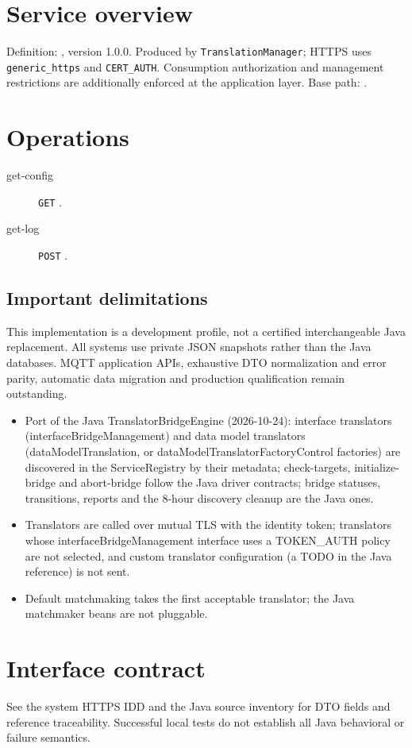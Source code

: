 \documentclass[a4paper]{arrowhead}
\begin{document}
\ArrowheadSetup
\section{Service overview}
Definition: , version 1.0.0. Produced by \texttt{TranslationManager}; HTTPS uses \texttt{generic\_https} and \texttt{CERT\_AUTH}. Consumption authorization and management restrictions are additionally enforced at the application layer. Base path: .
\section{Operations}
\begin{description}
\item[get-config] \texttt{GET} .
\item[get-log] \texttt{POST} .
\end{description}
\subsection{Important delimitations}
This implementation is a development profile, not a certified interchangeable Java replacement. All systems use private JSON snapshots rather than the Java databases. MQTT application APIs, exhaustive DTO normalization and error parity, automatic data migration and production qualification remain outstanding.
\begin{itemize}
\item Port of the Java TranslatorBridgeEngine (2026-10-24): interface translators (interfaceBridgeManagement) and data model translators (dataModelTranslation, or dataModelTranslatorFactoryControl factories) are discovered in the ServiceRegistry by their metadata; check-targets, initialize-bridge and abort-bridge follow the Java driver contracts; bridge statuses, transitions, reports and the 8-hour discovery cleanup are the Java ones.
\item Translators are called over mutual TLS with the identity token; translators whose interfaceBridgeManagement interface uses a TOKEN\_AUTH policy are not selected, and custom translator configuration (a TODO in the Java reference) is not sent.
\item Default matchmaking takes the first acceptable translator; the Java matchmaker beans are not pluggable.
\end{itemize}
\section{Interface contract}
See the system HTTPS IDD and the Java source inventory for DTO fields and reference traceability. Successful local tests do not establish all Java behavioral or failure semantics.
\end{document}
